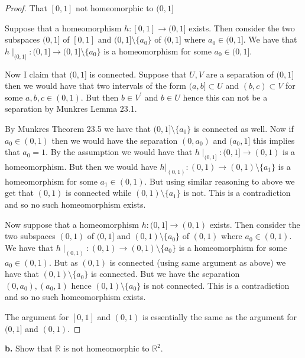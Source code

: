 \documentclass{amsart}
\theoremstyle{plain}
\theoremstyle{definition}
\theoremstyle{remark}
\begin{document}
\begin{proof}{That $[0,1]$ not homeomorphic to $(0,1]$}


    Suppose that a homeomorphism $h:[0,1]\to (0,1]$ exists. Then consider the two subspaces $(0,1]$ of $[0,1]$ and $(0,1]\setminus \{a_0\}$ of $(0,1]$ where $a_0\in (0,1]$. We have that $h\mid_{(0,1]}:(0,1]\to (0,1]\setminus \{a_0\}$ is a homeomorphism for some $a_0\in (0,1]$. 
    
    Now I claim that $(0,1]$ is connected. Suppose that $U,V$ are a separation of $(0,1]$ then we would have that two intervals of the form $(a,b]\subset U$ and $(b,c)\subset V$ for some $a,b,c\in (0,1)$. But then $b\in V^\prime$ and $b\in U$ hence this can not be a separation by Munkres Lemma 23.1. 

    By Munkres Theorem 23.5 we have that $(0,1]\setminus \{a_0\}$ is connected as well. Now if $a_0\in (0,1)$ then we would have the separation $(0,a_0)$ and $(a_0,1]$ this implies that $a_0=1$. By the assumption we would have that $h\mid_{(0,1]}:(0,1]\to (0,1)$ is a homeomorphism. But then we would have $h|_{(0,1)}:(0,1)\to (0,1)\setminus 
    \{a_1\}$ is a homeomorphism for some $a_1\in (0,1)$. But using similar reasoning to above we get that $(0,1)$ is connected while $(0,1)\setminus \{a_1\}$ is not. This is a contradiction and so no such homeomorphism exists.
\vspace{5mm}

    Now suppose that a homeomorphism $h:(0,1]\to (0,1)$ exists. Then consider the two subspaces $(0,1)$ of $(0,1]$ and $(0,1)\setminus \{a_0\}$ of $(0,1)$ where $a_0\in (0,1)$. We have that $h\mid_{(0,1)}:(0,1)\to (0,1)\setminus \{a_0\}$ is a homeomorphism for some $a_0\in (0,1)$. But as $(0,1)$ is connected (using same argument as above) we have that $(0,1)\setminus \{a_0\}$ is connected. But we have the separation $(0,a_0),(a_0,1)$ hence $(0,1)\setminus \{a_0\}$ is not connected. This is a contradiction and so no such homeomorphism exists.

    The argument for $[0,1]$ and $(0,1)$ is essentially the same as the argument for $(0,1]$ and $(0,1)$. 
    


\end{proof}





\vspace{.1in}
{\bfseries b.} Show that $\mathbb R$ is not homeomorphic to $\mathbb R ^2$. 
\end{document}
